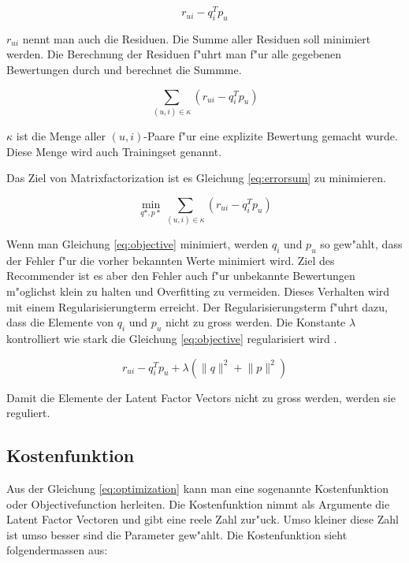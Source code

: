 \documentclass[a4paper, 12pt]{article}
\begin{document}
\begin{equation}
  \label{eq:error}
  r_{ui} - q_i^T p_u
\end{equation}

$r_{ui}$ nennt man auch die Residuen. Die Summe aller Residuen soll minimiert werden.
Die Berechnung der Residuen f"uhrt man f"ur alle gegebenen Bewertungen durch und berechnet die Summme.

\begin{equation}
\label{eq:errorsum}
  \sum_{(u,i) \in \kappa} (r_{ui} - q_i^T p_u)
\end{equation}

$\kappa$ ist die Menge aller $(u,i)$-Paare f"ur eine explizite Bewertung gemacht wurde. Diese Menge wird auch Trainingset genannt.

Das Ziel von Matrixfactorization ist es Gleichung \ref{eq:errorsum} zu minimieren. 

\begin{equation}
  \label{eq:objective}
  \min_{q*,p*} \sum_{(u,i) \in \kappa} (r_{ui} - q_i^T p_u)
\end{equation}

Wenn man Gleichung \ref{eq:objective} minimiert, werden $q_i$ und $p_u$ so gew"ahlt, dass der Fehler f"ur die vorher bekannten Werte minimiert wird. Ziel des Recommender ist es aber den Fehler auch f"ur unbekannte Bewertungen m"oglichst klein zu halten und Overfitting zu vermeiden. Dieses Verhalten wird mit einem Regularisierungterm erreicht. Der Regularisierungsterm f"uhrt dazu, dass die Elemente von $q_i$ und $p_u$ nicht zu gross werden. Die Konstante $\lambda$ kontrolliert wie stark die Gleichung \ref{eq:objective} regularisiert wird \cite{koren2009}.

\begin{equation}
  \label{eq:optimization}
    r_{ui} - q_i^T p_u + \lambda (\lVert q \rVert^2 + \lVert p \lVert ^2)
\end{equation}

Damit die Elemente der Latent Factor Vectors nicht zu gross werden, werden sie reguliert.

\subsection{Kostenfunktion}
\label{sec:opt}

Aus der Gleichung \ref{eq:optimization} kann man eine sogenannte Kostenfunktion oder Objectivefunction herleiten. Die Kostenfunktion nimmt als Argumente die Latent Factor Vectoren und gibt eine reele Zahl zur"uck. Umso kleiner diese Zahl ist umso besser sind die Parameter gew"ahlt. Die Kostenfunktion sieht folgendermassen aus:
\end{document}
